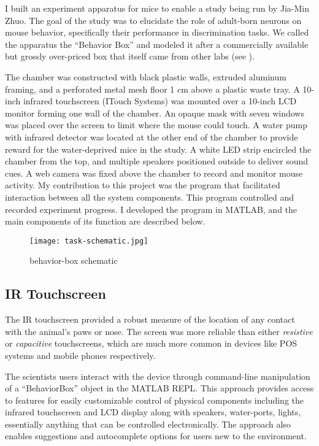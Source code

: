 \documentclass[../main.tex]{subfiles}
\begin{document}
I built an experiment apparatus for mice to enable a study being run by Jia-Min Zhuo.
The goal of the study was to elucidate the role of adult-born neurons on mouse behavior, specifically their performance in discrimination tasks.
We called the apparatus the ``Behavior Box'' and modeled it after a commercially available but grossly over-priced box that itself came from other labs (see \cite{McLelland2015}).

The chamber was constructed with black plastic walls, extruded aluminum framing, and a perforated metal mesh floor 1 cm above a plastic waste tray.
A 10-inch infrared touchscreen (ITouch Systems) was mounted over a 10-inch LCD monitor forming one wall of the chamber.
An opaque mask with seven windows was placed over the screen to limit where the mouse could touch.
A water pump with infrared detector was located at the other end of the chamber to provide reward for the water-deprived mice in the study.
A white LED strip encircled the chamber from the top, and multiple speakers positioned outside to deliver sound cues.
A web camera was fixed above the chamber to record and monitor mouse activity.
My contribution to this project was the program that facilitated interaction between all the system components.
This program controlled and recorded experiment progress.
I developed the program in MATLAB, and the main components of its function are described below.

\begin{figure}
	\texttt{[image: task-schematic.jpg]}
	\caption{behavior-box schematic}
	\label{fig:behaivorbox schematic}
\end{figure}

\subsection{
	IR Touchscreen}\label{sec:ir-touchscreen}

The IR touchscreen provided a robust measure of the location of any contact with the animal's paws or nose.
The screen was more reliable than either \emph{resistive} or \emph{capacitive} touchscreens, which are much more common in devices like POS systems and mobile phones respectively.

The scientists users interact with the device through command-line manipulation of a ``BehaviorBox'' object in the MATLAB REPL.
This approach provides access to features for easily customizable control of physical components including the infrared touchscreen and LCD display along with speakers, water-ports, lights, essentially anything that can be controlled electronically.
The approach also enables suggestions and autocomplete options for users new to the environment.
\end{document}
